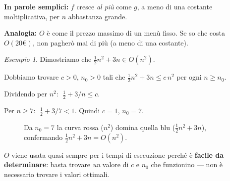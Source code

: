 \documentclass[a4paper, 11pt]{article}
\theoremstyle{definition}
\theoremstyle{remark}
\newtheorem{esempio}{Esempio}[section]
\theoremstyle{remark}
\newenvironment{nota}{%
	\begin{tcolorbox}[
		colback=codebg,
		colframe=primary,
		fonttitle=\bfseries,
		title=Nota,
		left=6pt, right=6pt, top=4pt, bottom=4pt
		]
	}{%
	\end{tcolorbox}
}
\begin{document}
	\begin{nota}
		\textbf{In parole semplici:} $f$ cresce \textit{al più} come $g$,
		a meno di una costante moltiplicativa, per $n$ abbastanza grande.
		
		\textbf{Analogia:} $O$ è come il prezzo massimo di un menù fisso.
		Se so che costa $O(20\text{€})$, non pagherò mai di più (a meno
		di una costante).
	\end{nota}
	
	\begin{esempio}
		Dimostriamo che $\tfrac{1}{2}n^2 + 3n \in O(n^2)$.
		
		Dobbiamo trovare $c > 0$, $n_0 > 0$ tali che
		$\tfrac{1}{2}n^2 + 3n \le c\,n^2$ per ogni $n \ge n_0$.
		
		Dividendo per $n^2$: $\;\tfrac{1}{2} + 3/n \le c$.
		
		Per $n \ge 7$: $\;\tfrac{1}{2}+3/7 < 1$. Quindi $c=1$, $n_0=7$. \checkmark
	\end{esempio}
	
	\begin{figure}[H]
		\centering
		\caption{Da $n_0=7$ la curva rossa ($n^2$) domina quella blu
			($\tfrac{1}{2}n^2+3n$), confermando
			$\tfrac{1}{2}n^2+3n = O(n^2)$.}
	\end{figure}
	
	\begin{hardnote}
		$O$ viene usata quasi sempre per i tempi di esecuzione perché è
		\textbf{facile da determinare}: basta trovare \textit{un} valore
		di $c$ e $n_0$ che funzionino — non è necessario trovare i valori
		ottimali.
	\end{hardnote}
	
\end{document}
